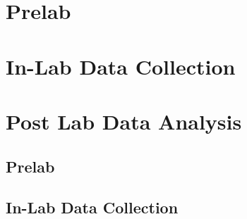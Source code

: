\documentclass[12pt]{article}
\begin{document}

\begin{fullreport}
    
    \section{Prelab}
    
    \clearpage
    \section{In-Lab Data Collection}
    
    \clearpage
    \section{Post Lab Data Analysis}
    
\end{fullreport}

\begin{prelab}
    \section{Prelab}
    
    \clearpage
\end{prelab}

\begin{data}
    \section{In-Lab Data Collection}
    
\end{data}
\end{document}
